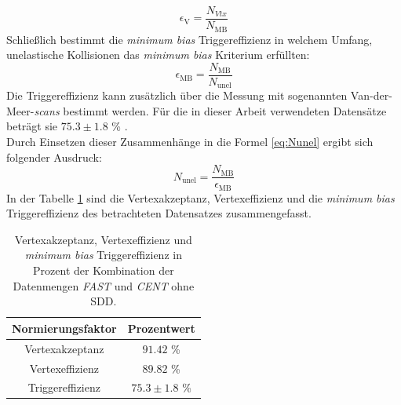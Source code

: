 \documentclass[12pt,a4paper]{report}
\begin{document}
\begin{equation}
\epsilon_{\mathrm{V}} = \dfrac{N_{Vtx}}{N_{\mathrm{MB}}}
\end{equation}
Schließlich bestimmt die \textit{minimum bias} Triggereffizienz in welchem Umfang, unelastische Kollisionen das \textit{minimum bias} Kriterium erfüllten:
\begin{equation}
\epsilon_{\mathrm{MB}} = \dfrac{N_{\mathrm{MB}}}{N_{\mathrm{unel}}}
\end{equation}
Die Triggereffizienz kann zusätzlich über die Messung mit sogenannten Van-der-Meer-\textit{scans} bestimmt werden. Für die in dieser Arbeit verwendeten Datensätze beträgt sie $75.3 \pm 1.8$ \% \cite{ALICE-PUBLIC-2018-014}.\\
Durch Einsetzen dieser Zusammenhänge in die Formel \ref{eq:Nunel} ergibt sich folgender Ausdruck:
\begin{equation}
N_{\mathrm{unel}} = \dfrac{N_{\mathrm{MB}}}{\epsilon_{\mathrm{MB}}}
\end{equation}
In der Tabelle \ref{tab:Normierung} sind die Vertexakzeptanz, Vertexeffizienz und die \textit{minimum bias} Triggereffizienz des betrachteten Datensatzes zusammengefasst.
\begin{table}
\centering
\begin{tabular}{|c c|}
\hline
\textbf{Normierungsfaktor} & \textbf{Prozentwert} \\
\hline
\hline
\rowcolor{mygray} Vertexakzeptanz & $91.42$ \% \\ 
				  Vertexeffizienz& $89.82$ \% \\ 
\rowcolor{mygray} Triggereffizienz& $75.3 \pm 1.8$ \%\\ 
\hline
\end{tabular}
\caption{Vertexakzeptanz, Vertexeffizienz und  \textit{minimum bias} Triggereffizienz in Prozent der Kombination der Datenmengen \textit{FAST} und \textit{CENT} ohne SDD.}
\label{tab:Normierung}
\end{table} 
\end{document}
